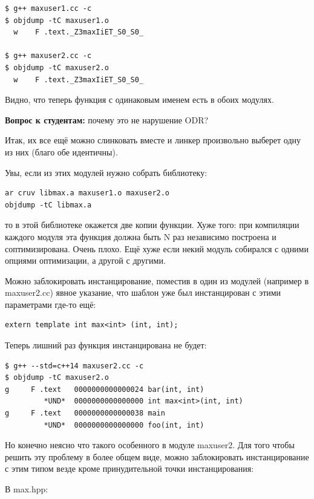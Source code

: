 \documentclass[a4paper,12pt,oneside]{book}
\newif\ifanswers
\begin{document}
\begin{verbatim}
$ g++ maxuser1.cc -c
$ objdump -tC maxuser1.o
  w    F .text._Z3maxIiET_S0_S0_

$ g++ maxuser2.cc -c
$ objdump -tC maxuser2.o
  w    F .text._Z3maxIiET_S0_S0_
\end{verbatim}

Видно, что теперь функция с одинаковым именем есть в обоих модулях.

\textbf{Вопрос к студентам:} почему это не нарушение ODR?

\ifanswers
Верный ответ: в ODR для шаблонных функций слово one означает один на модуль
\fi

Итак, их все ещё можно слинковать вместе и линкер произвольно выберет одну из них (благо обе идентичны).

Увы, если из этих модулей нужно собрать библиотеку:

\begin{verbatim}
ar cruv libmax.a maxuser1.o maxuser2.o
objdump -tC libmax.a
\end{verbatim}

то в этой библиотеке окажется две копии функции. Хуже того: при компиляции каждого модуля эта функция должна быть N раз независимо построена и соптимизирована. Очень плохо. Ещё хуже если некий модуль собирался с одними опциями оптимизации, а другой с другими.

Можно заблокировать инстанцирование, поместив в один из модулей (например в maxuser2.cc) явное указание, что шаблон уже был инстанцирован с этими параметрами где-то ещё:

\begin{lstlisting}
extern template int max<int> (int, int);
\end{lstlisting}

Теперь лишний раз функция инстанцирована не будет:

\begin{verbatim}
$ g++ --std=c++14 maxuser2.cc -c
$ objdump -tC maxuser2.o
g     F .text	0000000000000024 bar(int, int)
         *UND*	0000000000000000 int max<int>(int, int)
g     F .text	0000000000000038 main
         *UND*	0000000000000000 foo(int, int)
\end{verbatim}

Но конечно неясно что такого особенного в модуле maxuser2. Для того чтобы решить эту проблему в более общем виде, можно заблокировать инстанцирование с этим типом везде кроме принудительной точки инстанцирования:

В max.hpp:
\end{document}

